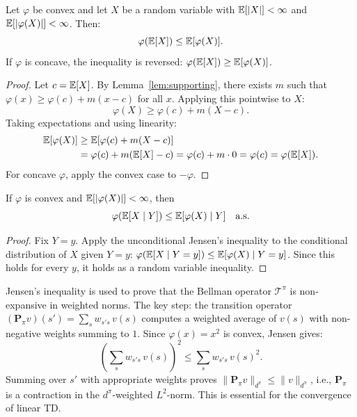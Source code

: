 \documentclass[11pt,a4paper]{article}
\begin{document}
\begin{keyresult}[title={Jensen's Inequality}]
\begin{theorem}
\label{thm:jensen}
Let $\varphi$ be convex and let $X$ be a random variable with
$\mathbb{E}[|X|] < \infty$ and $\mathbb{E}[|\varphi(X)|] < \infty$.  Then:
\begin{equation}
  \varphi\!\left(\mathbb{E}[X]\right) \leq \mathbb{E}[\varphi(X)].
  \label{eq:jensen}
\end{equation}
If $\varphi$ is concave, the inequality is reversed:
$\varphi(\mathbb{E}[X]) \geq \mathbb{E}[\varphi(X)]$.
\end{theorem}
\end{keyresult}

\begin{proof}
Let $c = \mathbb{E}[X]$.  By Lemma~\ref{lem:supporting}, there exists
$m$ such that $\varphi(x) \geq \varphi(c) + m(x - c)$ for all
$x$.  Applying this pointwise to $X$:
\begin{equation}
  \varphi(X) \geq \varphi(c) + m(X - c).
  \label{eq:jensen_pointwise}
\end{equation}
Taking expectations and using linearity:
\begin{align}
  \mathbb{E}[\varphi(X)]
  &\geq \mathbb{E}[\varphi(c) + m(X - c)]
  \nonumber\\
  &= \varphi(c) + m(\mathbb{E}[X] - c)
  = \varphi(c) + m \cdot 0
  = \varphi(c)
  = \varphi(\mathbb{E}[X]).
  \label{eq:jensen_final}
\end{align}
For concave $\varphi$, apply the convex case to $-\varphi$.
\end{proof}

\begin{theorem}
\label{thm:cond_jensen}
If $\varphi$ is convex and $\mathbb{E}[|\varphi(X)|] < \infty$, then
\begin{equation}
  \varphi\!\left(\mathbb{E}[X \mid Y]\right)
  \leq \mathbb{E}[\varphi(X) \mid Y]
  \quad \text{a.s.}
  \label{eq:cond_jensen}
\end{equation}
\end{theorem}

\begin{proof}
Fix $Y = y$.  Apply the unconditional Jensen's inequality to the
conditional distribution of $X$ given $Y = y$:
$\varphi(\mathbb{E}[X \mid Y = y]) \leq \mathbb{E}[\varphi(X) \mid Y = y]$.
Since this holds for every $y$, it holds as a random variable
inequality.
\end{proof}

\begin{rlconnection}[title={Connection to RL: Bellman Operator Contraction}]
Jensen's inequality is used to prove that the Bellman operator
$\mathcal{T}^\pi$ is non-expansive in weighted norms.  The key
step: the transition operator
$(\mathbf{P}_\pi v)(s') = \sum_s w_{s's}\, v(s)$ computes a
weighted average of $v(s)$ with non-negative weights summing to
$1$.  Since $\varphi(x) = x^2$ is convex, Jensen gives:
\[
  \left(\sum_s w_{s's}\, v(s)\right)^2
  \leq \sum_s w_{s's}\, v(s)^2.
\]
Summing over $s'$ with appropriate weights proves
$\|\mathbf{P}_\pi v\|_{d^\pi} \leq \|v\|_{d^\pi}$, i.e.,
$\mathbf{P}_\pi$ is a contraction in the $d^\pi$-weighted
$L^2$-norm.  This is essential for the convergence of linear TD.
\end{rlconnection}
\end{document}
